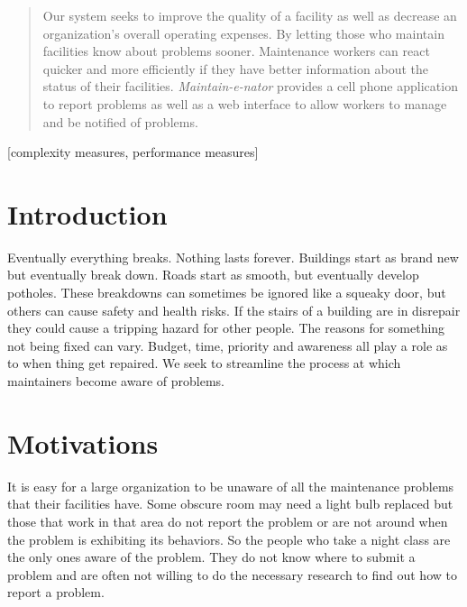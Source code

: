 \documentclass{acm_proc_article-sp}
\begin{document}
\maketitle

\begin{abstract}
Our system seeks to improve the quality of a facility as well as decrease an organization's overall operating expenses.  By letting those who maintain facilities know about problems sooner. Maintenance workers can react quicker and more efficiently if they have better information about the status of their facilities.  \textit{Maintain-e-nator} provides a cell phone application to report problems as well as a web interface to allow workers to manage and be notified of problems.
\end{abstract}

[complexity measures, performance measures]


\section{Introduction}
Eventually everything breaks. Nothing lasts forever. Buildings start as brand new but eventually break down.  Roads start as smooth, but eventually develop potholes.  These breakdowns can sometimes be ignored like a squeaky door, but others can cause safety and health risks. If the stairs of a building are in disrepair they could cause a tripping hazard for other people. The reasons for something not being fixed can vary. Budget, time, priority and awareness all play a role as to when thing get repaired. We seek to streamline the process at which maintainers become aware of problems.

\section{Motivations}
It is easy for a large organization to be unaware of all the maintenance problems that their facilities have. Some obscure room may need a light bulb replaced but those that work in that area do not report the problem or are not around when the problem is exhibiting its behaviors.  So the people who take a night class are the only ones aware of the problem.  They do not know where to submit a problem and are often not willing to do the necessary research to find out how to report a problem.
\end{document}

